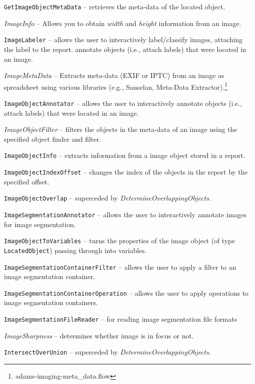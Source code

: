\documentclass[a4paper]{book}
\begin{document}
\begin{tight_itemize}
  \item \texttt{GetImageObjectMetaData} -- retrieves the meta-data of
  the located object.
  \item \textit{ImageInfo} -- Allows you to obtain \textit{width} and
  \textit{height} information from an image.
  \item \texttt{ImageLabeler} -- allows the user to interactively label/classify
  images, attaching the label to the report.
   annotate objects (i.e., attach labels) that were located in an image.
  \item \textit{ImageMetaData} -- Extracts meta-data (EXIF or IPTC) from an
  image as spreadsheet using various libraries (e.g., Sanselan\cite{sanselan},
  Meta-Data Extractor\cite{metadataextractor}).\footnote{adams-imaging-meta\_data.flow}
  \item \texttt{ImageObjectAnnotator} -- allows the user to interactively
   annotate objects (i.e., attach labels) that were located in an image.
  \item \textit{ImageObjectFilter} -- filters the objects in the meta-data of an image
  using the specified object finder and filter.
  \item \texttt{ImageObjectInfo} -- extracts information from a image object
  stored in a report.
  \item \texttt{ImageObjectIndexOffset} -- changes the index of the objects in the
  report by the specified offset.
  \item \texttt{ImageObjectOverlap} -- superceded by \textit{DetermineOverlappingObjects}.
  \item \texttt{ImageSegmentationAnnotator} -- allows the user to interactively
  annotate images for image segmentation.
  \item \texttt{ImageObjectToVariables} -- turns the properties of the image object
  (of type \texttt{LocatedObject}) passing through into variables.
  \item \texttt{ImageSegmentationContainerFilter} -- allows the user to apply a
  filter to an image segmentation container.
  \item \texttt{ImageSegmentationContainerOperation} -- allows the user to apply
  operations to image segmentation containers.
  \item \texttt{ImageSegmentationFileReader} -- for reading image segmentation file formats
  \item \textit{ImageSharpness} -- determines whether image is in focus or not.
  \item \texttt{IntersectOverUnion} -- superceded by \textit{DetermineOverlappingObjects}.

\end{tight_itemize}
\end{document}
